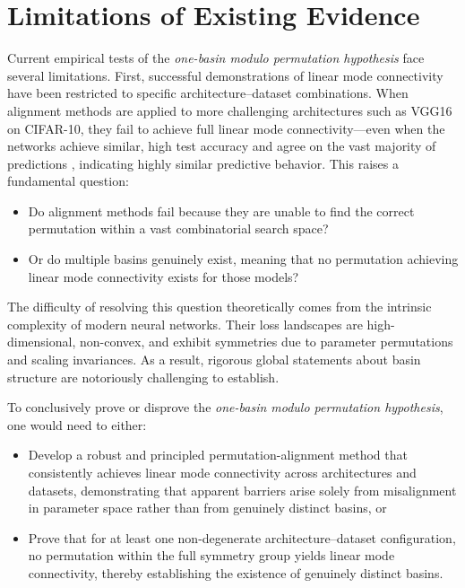 \documentclass[11pt,a4paper]{report}
\begin{document}
\section{Limitations of Existing Evidence}

Current empirical tests of the \textit{one-basin modulo permutation hypothesis} face several limitations. 
First, successful demonstrations of linear mode connectivity have been restricted 
to specific architecture–dataset combinations. When alignment methods are applied 
to more challenging architectures such as VGG16 on CIFAR-10, they fail to achieve 
full linear mode connectivity—even when the networks achieve similar, high test 
accuracy and agree on the vast majority of predictions \citep{ainsworth2023git}, indicating highly similar predictive behavior. This raises a fundamental question:

\begin{itemize}
    \item Do alignment methods fail because they are unable to find the correct permutation within a vast combinatorial search space?
    \item Or do multiple basins genuinely exist, meaning that no permutation achieving linear mode connectivity exists for those models?
\end{itemize}

The difficulty of resolving this question theoretically comes from the intrinsic 
complexity of modern neural networks. Their loss landscapes are high-dimensional, 
non-convex, and exhibit symmetries due to parameter permutations and 
scaling invariances. As a result, rigorous global statements about basin structure 
are notoriously challenging to establish.

To conclusively prove or disprove the \textit{one-basin modulo permutation hypothesis}, 
one would need to either:

\begin{itemize}
    \item Develop a robust and principled permutation-alignment method that consistently achieves
    linear mode connectivity across architectures and datasets, demonstrating that apparent
    barriers arise solely from misalignment in parameter space rather than from genuinely distinct basins, or
    \item Prove that for at least one non-degenerate architecture–dataset configuration, 
    no permutation within the full symmetry group yields linear mode connectivity, 
    thereby establishing the existence of genuinely distinct basins.
\end{itemize}
\end{document}
